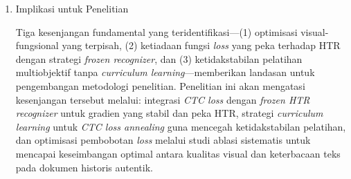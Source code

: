 \begin{enumerate}[leftmargin=*, labelindent=0pt, itemsep=1ex, topsep=0pt]
\item Implikasi untuk Penelitian

Tiga kesenjangan fundamental yang teridentifikasi—(1) optimisasi visual-fungsional yang terpisah, (2) ketiadaan fungsi \textit{loss} yang peka terhadap HTR dengan strategi \textit{frozen recognizer}, dan (3) ketidakstabilan pelatihan multiobjektif tanpa \textit{curriculum learning}—memberikan landasan untuk pengembangan metodologi penelitian. Penelitian ini akan mengatasi kesenjangan tersebut melalui: integrasi \textit{CTC loss} dengan \textit{frozen HTR recognizer} untuk gradien yang stabil dan peka HTR, strategi \textit{curriculum learning} untuk \textit{CTC loss annealing} guna mencegah ketidakstabilan pelatihan, dan optimisasi pembobotan \textit{loss} melalui studi ablasi sistematis untuk mencapai keseimbangan optimal antara kualitas visual dan keterbacaan teks pada dokumen historis autentik.

\end{enumerate}


